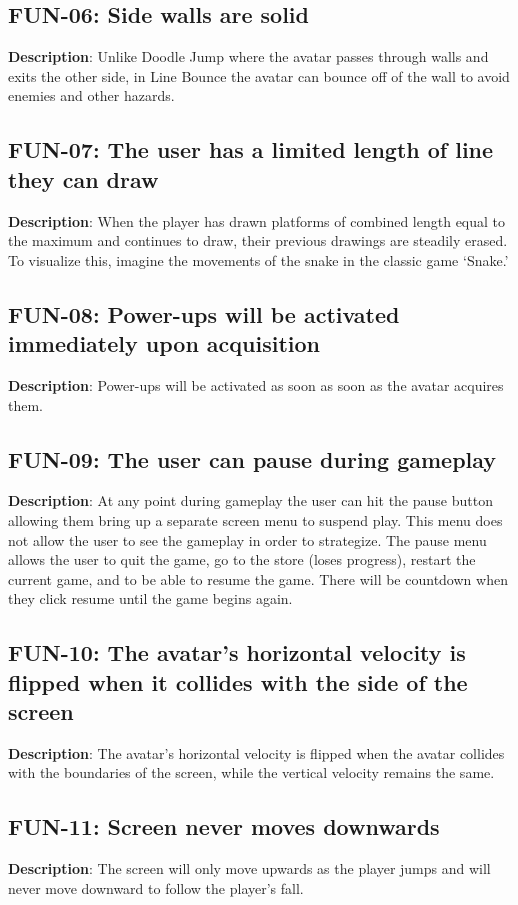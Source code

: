 \subsection{FUN-06: Side walls are solid}
\textbf{Description}: Unlike Doodle Jump where the avatar passes through
walls and exits the other side, in Line Bounce the avatar can bounce
off of the wall to avoid enemies and other hazards.

\subsection{FUN-07: The user has a limited length of line they can draw}
\textbf{Description}: When the player has drawn platforms of combined
length equal to the maximum and continues to draw, their previous
drawings are steadily erased. To visualize this, imagine the movements
of the snake in the classic game \textquoteleft{}Snake.\textquoteright{}

\subsection{FUN-08: Power-ups will be activated immediately upon acquisition }
\textbf{Description}: Power-ups will be activated as soon as soon
as the avatar acquires them.

\subsection{FUN-09: The user can pause during gameplay}
\textbf{Description}: At any point during gameplay the user can hit
the pause button allowing them bring up a separate screen menu to
suspend play. This menu does not allow the user to see the gameplay
in order to strategize. The pause menu allows the user to quit the
game, go to the store (loses progress), restart the current game,
and to be able to resume the game. There will be countdown when they
click resume until the game begins again.

\subsection{FUN-10: The avatar\textquoteright{}s horizontal velocity is flipped
when it collides with the side of the screen}
\textbf{Description}: The avatar\textquoteright{}s horizontal velocity
is flipped when the avatar collides with the boundaries of the screen,
while the vertical velocity remains the same. 

\subsection{FUN-11: Screen never moves downwards}
\textbf{Description}: The screen will only move upwards as the player
jumps and will never move downward to follow the player\textquoteright{}s
fall.

